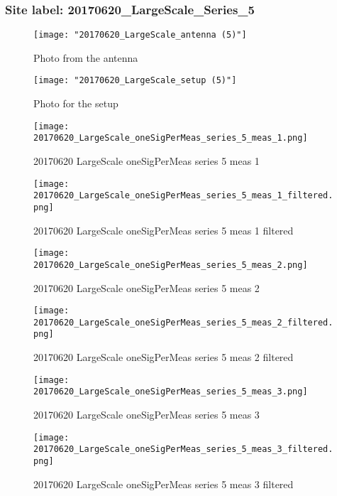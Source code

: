 \subsubsection{Site label: 20170620\_LargeScale\_Series\_5}
\begin{figure}[ht] \caption{Photo from the antenna}
\texttt{[image: "20170620\_LargeScale\_antenna (5)"]}\centering\end{figure}
\begin{figure}[ht] \caption{Photo for the setup}
\texttt{[image: "20170620\_LargeScale\_setup (5)"]}\centering\end{figure}
\begin{figure}[ht] \caption{20170620 LargeScale oneSigPerMeas series 5 meas 1}
\texttt{[image: 20170620\_LargeScale\_oneSigPerMeas\_series\_5\_meas\_1.png]}\centering\end{figure}
\begin{figure}[ht] \caption{20170620 LargeScale oneSigPerMeas series 5 meas 1 filtered}
\texttt{[image: 20170620\_LargeScale\_oneSigPerMeas\_series\_5\_meas\_1\_filtered.png]}\centering\end{figure}
\begin{figure}[ht] \caption{20170620 LargeScale oneSigPerMeas series 5 meas 2}
\texttt{[image: 20170620\_LargeScale\_oneSigPerMeas\_series\_5\_meas\_2.png]}\centering\end{figure}
\begin{figure}[ht] \caption{20170620 LargeScale oneSigPerMeas series 5 meas 2 filtered}
\texttt{[image: 20170620\_LargeScale\_oneSigPerMeas\_series\_5\_meas\_2\_filtered.png]}\centering\end{figure}
\begin{figure}[ht] \caption{20170620 LargeScale oneSigPerMeas series 5 meas 3}
\texttt{[image: 20170620\_LargeScale\_oneSigPerMeas\_series\_5\_meas\_3.png]}\centering\end{figure}
\begin{figure}[ht] \caption{20170620 LargeScale oneSigPerMeas series 5 meas 3 filtered}
\texttt{[image: 20170620\_LargeScale\_oneSigPerMeas\_series\_5\_meas\_3\_filtered.png]}\centering\end{figure}
\clearpage
